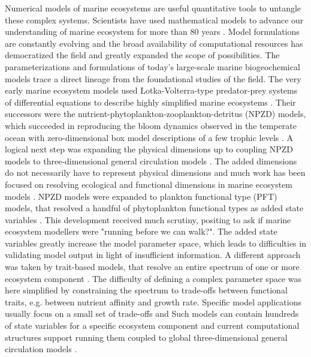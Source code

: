 \documentclass[journal abbreviation, manuscript]{copernicus}
\begin{document}
Numerical models of marine ecosystems are useful quantitative tools to untangle these complex systems. Scientists have used mathematical models to advance our understanding of marine ecosystem for more than 80 years \citep{Gentleman2002a}. Model formulations are constantly evolving and the broad availability of computational resources has democratized the field and greatly expanded the scope of possibilities.
The parameterizations and formulations of today's large-scale marine biogeochemical models trace a direct lineage from the foundational studies of the field. The very early marine ecosystem models used Lotka-Volterra-type predator-prey systems of differential equations to describe highly simplified marine ecosystems \citep{Fleming1939, Riley1946FactorsBank}. Their successors were the nutrient-phytoplankton-zooplankton-detritus (NPZD) models, which succeeded in reproducing the bloom dynamics observed in the temperate ocean with zero-dimensional box model descriptions of a few trophic levels \citep{Evans1985ACycles, Fasham1990a}. A logical next step was expanding the physical dimensions up to coupling NPZD models to three-dimensional general circulation models \citep[e.g.][]{Sarmiento1993AZone}.
The added dimensions do not necessarily have to represent physical dimensions and much work has been focused on resolving ecological and functional dimensions in marine ecosystem models \citep{Follows2011ModelingMicrobes}.
NPZD models were expanded to plankton functional type (PFT) models, that resolved a handful of phytoplankton functional types as added state variables \citep{LeQuere2005}.
This development received much scrutiny, positing \citet{Anderson2005} to ask if marine ecosystem modellers were "running before we can walk?". The added state variables greatly increase the model parameter space, which leads to difficulties in validating model output in light of insufficient information.
A different approach was taken by trait-based models, that resolve an entire spectrum of one or more ecosystem component \citep{Bruggeman2007a, Merico2009, Follows2007EmergentOcean}. The difficulty of defining a complex parameter space was here simplified by constraining the spectrum to trade-offs between functional traits, e.g. between nutrient affinity and growth rate. Specific model applications usually focus on a small set of trade-offs and 
Such models can contain hundreds of state variables for a specific ecosystem component and current computational structures support running them coupled to global three-dimensional general circulation models \citep{Dutkiewicz2020DimensionsDiversity}.
\end{document}
